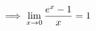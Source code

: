 \documentclass[preview]{standalone}
\begin{document}
\begin{align*}
\special{dvisvgm:raw <g id='unique000'>}\implies \lim_{x \to 0} \frac{e^x - 1}{x} = 1\special{dvisvgm:raw </g>}
\end{align*}
\end{document}
